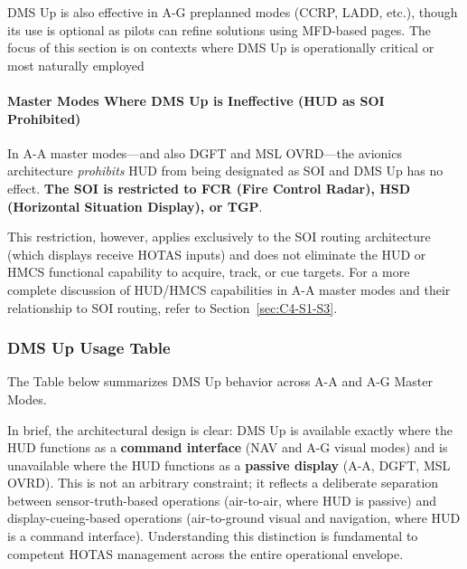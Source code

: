 \documentclass[11pt,a4paper]{article}
\begin{document}
DMS Up is also effective in A-G preplanned modes (CCRP, LADD, etc.), though its use is optional as pilots can refine solutions using MFD-based pages. The focus of this section is on contexts where DMS Up is operationally critical or most naturally employed

\paragraph*{Master Modes Where DMS Up is Ineffective (HUD as SOI Prohibited)}

In A-A master modes---and also DGFT and MSL OVRD---the avionics architecture \textit{prohibits} HUD from being designated as SOI and DMS Up has no effect. \textbf{The SOI is restricted to FCR (Fire Control Radar), HSD (Horizontal Situation Display), or TGP}.

This restriction, however, applies exclusively to the SOI routing architecture (which displays receive HOTAS inputs) and does not eliminate the HUD or HMCS functional capability to acquire, track, or cue targets. For a more complete discussion of HUD/HMCS capabilities in A-A master modes and their relationship to SOI routing, refer to Section~\ref{sec:C4-S1-S3}.

\subsubsection{DMS Up Usage Table}

The Table below summarizes DMS Up behavior across A-A and A-G Master Modes.

In brief, the architectural design is clear: DMS Up is available exactly where the HUD functions as a \textbf{command interface} (NAV and A-G visual modes) and is unavailable where the HUD functions as a \textbf{passive display} (A-A, DGFT, MSL OVRD). This is not an arbitrary constraint; it reflects a deliberate separation between sensor-truth-based operations (air-to-air, where HUD is passive) and display-cueing-based operations (air-to-ground visual and navigation, where HUD is a command interface). Understanding this distinction is fundamental to competent HOTAS management across the entire operational envelope. 
\end{document}
